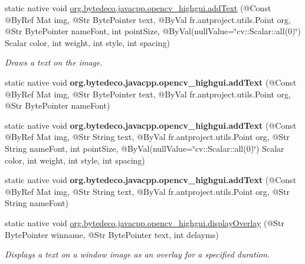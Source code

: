 \begin{DoxyCompactItemize}
\item 
static native void \hyperlink{group__highgui__qt_ga7595781df35faa10eff729ed3e41b5fd}{org.\+bytedeco.\+javacpp.\+opencv\+\_\+highgui.\+add\+Text} (@Const @By\+Ref Mat img, @Str Byte\+Pointer text, @By\+Val fr.antproject.utils.Point org, @Str Byte\+Pointer name\+Font, int point\+Size, @By\+Val(null\+Value=\char`\"{}cv\+::\+Scalar\+::all(0)\char`\"{}) Scalar color, int weight, int style, int spacing)
\begin{DoxyCompactList}\small\item\em Draws a text on the image. \end{DoxyCompactList}\item 
\mbox{\label{group__highgui__qt_ga6412b7ed2f66fe41c4fa0b92a6fa4d46}} 
static native void {\bfseries org.\+bytedeco.\+javacpp.\+opencv\+\_\+highgui.\+add\+Text} (@Const @By\+Ref Mat img, @Str Byte\+Pointer text, @By\+Val fr.antproject.utils.Point org, @Str Byte\+Pointer name\+Font)
\item 
\mbox{\label{group__highgui__qt_gad3d4abbb9eed25736b2f19189d75cc0c}} 
static native void {\bfseries org.\+bytedeco.\+javacpp.\+opencv\+\_\+highgui.\+add\+Text} (@Const @By\+Ref Mat img, @Str String text, @By\+Val fr.antproject.utils.Point org, @Str String name\+Font, int point\+Size, @By\+Val(null\+Value=\char`\"{}cv\+::\+Scalar\+::all(0)\char`\"{}) Scalar color, int weight, int style, int spacing)
\item 
\mbox{\label{group__highgui__qt_gaeb7bf4176b36e382ec908bf7647bb945}} 
static native void {\bfseries org.\+bytedeco.\+javacpp.\+opencv\+\_\+highgui.\+add\+Text} (@Const @By\+Ref Mat img, @Str String text, @By\+Val fr.antproject.utils.Point org, @Str String name\+Font)
\item 
static native void \hyperlink{group__highgui__qt_ga70784449604551e57ffd968370f887a8}{org.\+bytedeco.\+javacpp.\+opencv\+\_\+highgui.\+display\+Overlay} (@Str Byte\+Pointer winname, @Str Byte\+Pointer text, int delayms)
\begin{DoxyCompactList}\small\item\em Displays a text on a window image as an overlay for a specified duration. \end{DoxyCompactList}\item 
\mbox{\label{group__highgui__qt_gacfdd6244fcfd3e885c981714cf8fe73f}} 

\end{DoxyCompactItemize}
